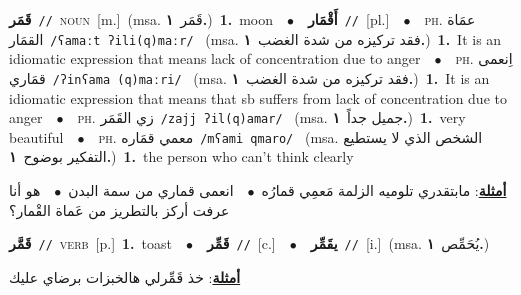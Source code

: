 \documentclass[10pt,a4paper,twoside]{article} %
\begin{document}
\begin{multicols}{2}
{\setlength\topsep{0pt}\textbf{\foreignlanguage{arabic}{قَمَر}}\ {\color{gray}\texttt{//}\color{black}}\ \textsc{noun}\ [m.]\ \color{gray}(msa. \foreignlanguage{arabic}{قَمَر}~\foreignlanguage{arabic}{\textbf{١.}})\color{black}\ \textbf{1.}~moon\ \ $\bullet$\ \ \setlength\topsep{0pt}\textbf{\foreignlanguage{arabic}{أَقْمَار}}\ {\color{gray}\texttt{//}\color{black}}\ [pl.]\ \ $\bullet$\ \ \textsc{ph.} \color{gray} \foreignlanguage{arabic}{عمَاة القمَار}\color{black}\ {\color{gray}\texttt{/{\sffamily ʕamaːt ʔili(q)maːr}/}\color{black}}\ \color{gray} (msa. \foreignlanguage{arabic}{فقد تركيزه من شدة الغضب}~\foreignlanguage{arabic}{\textbf{١.}})\color{black}\ \textbf{1.}~It is an idiomatic expression that means lack of concentration due to anger\ \ $\bullet$\ \ \textsc{ph.} \color{gray} \foreignlanguage{arabic}{اِنعمى قمَاري}\color{black}\ {\color{gray}\texttt{/{\sffamily ʔinʕama (q)maːri}/}\color{black}}\ \color{gray} (msa. \foreignlanguage{arabic}{فقد تركيزه من شدة الغضب}~\foreignlanguage{arabic}{\textbf{١.}})\color{black}\ \textbf{1.}~It is an idiomatic expression that means that sb suffers from lack of concentration due to anger\ \ $\bullet$\ \ \textsc{ph.} \color{gray} \foreignlanguage{arabic}{زي القَمَر}\color{black}\ {\color{gray}\texttt{/{\sffamily zajj ʔil(q)amar}/}\color{black}}\ \color{gray} (msa. \foreignlanguage{arabic}{جميل جداً}~\foreignlanguage{arabic}{\textbf{١.}})\color{black}\ \textbf{1.}~very beautiful\ \ $\bullet$\ \ \textsc{ph.} \color{gray} \foreignlanguage{arabic}{معمي قمَاره}\color{black}\ {\color{gray}\texttt{/{\sffamily mʕami qmaro}/}\color{black}}\ \color{gray} (msa. \foreignlanguage{arabic}{الشخص الذي لا يستطيع التفكير بوضوح}~\foreignlanguage{arabic}{\textbf{١.}})\color{black}\ \textbf{1.}~the person who can't think clearly\  \begin{flushright}\color{gray}\foreignlanguage{arabic}{\textbf{\underline{\foreignlanguage{arabic}{أمثلة}}}: مابتقدري تلوميه الزلمة مَعمِي قمارُه\ $\bullet$\ \  انعمى قماري من سمة البدن\ $\bullet$\ \  هو أنا عرفت أركز بالتطريز من عَماة القْمار؟}\end{flushright}\color{black}} \vspace{2mm}

{\setlength\topsep{0pt}\textbf{\foreignlanguage{arabic}{قَمَّر}}\ {\color{gray}\texttt{//}\color{black}}\ \textsc{verb}\ [p.]\ \textbf{1.}~toast\ \ $\bullet$\ \ \setlength\topsep{0pt}\textbf{\foreignlanguage{arabic}{قَمِّر}}\ {\color{gray}\texttt{//}\color{black}}\ [c.]\ \ $\bullet$\ \ \setlength\topsep{0pt}\textbf{\foreignlanguage{arabic}{يقَمِّر}}\ {\color{gray}\texttt{//}\color{black}}\ [i.]\ \color{gray}(msa. \foreignlanguage{arabic}{يُحَمِّص}~\foreignlanguage{arabic}{\textbf{١.}})\color{black}\  \begin{flushright}\color{gray}\foreignlanguage{arabic}{\textbf{\underline{\foreignlanguage{arabic}{أمثلة}}}: خذ قَمِّرلي هالخبزات برضاي عليك}\end{flushright}\color{black}} \vspace{2mm}


\end{multicols}
\end{document}
